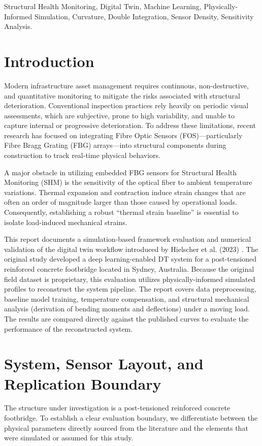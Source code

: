 \documentclass[11pt,journal,onecolumn]{IEEEtran}
\begin{document}
\begin{IEEEkeywords}
Structural Health Monitoring, Digital Twin, Machine Learning, Physically-Informed Simulation, Curvature, Double Integration, Sensor Density, Sensitivity Analysis.
\end{IEEEkeywords}

\newpage

\section{Introduction}
Modern infrastructure asset management requires continuous, non-destructive, and quantitative monitoring to mitigate the risks associated with structural deterioration. Conventional inspection practices rely heavily on periodic visual assessments, which are subjective, prone to high variability, and unable to capture internal or progressive deterioration. To address these limitations, recent research has focused on integrating Fibre Optic Sensors (FOS)---particularly Fibre Bragg Grating (FBG) arrays---into structural components during construction to track real-time physical behaviors.

A major obstacle in utilizing embedded FBG sensors for Structural Health Monitoring (SHM) is the sensitivity of the optical fiber to ambient temperature variations. Thermal expansion and contraction induce strain changes that are often an order of magnitude larger than those caused by operational loads. Consequently, establishing a robust ``thermal strain baseline'' is essential to isolate load-induced mechanical strains.

This report documents a simulation-based framework evaluation and numerical validation of the digital twin workflow introduced by Hielscher et al. (2023) \cite{hielscher2023neural}. The original study developed a deep learning-enabled DT system for a post-tensioned reinforced concrete footbridge located in Sydney, Australia. Because the original field dataset is proprietary, this evaluation utilizes physically-informed simulated profiles to reconstruct the system pipeline. The report covers data preprocessing, baseline model training, temperature compensation, and structural mechanical analysis (derivation of bending moments and deflections) under a moving load. The results are compared directly against the published curves to evaluate the performance of the reconstructed system.

\section{System, Sensor Layout, and Replication Boundary}
The structure under investigation is a post-tensioned reinforced concrete footbridge. To establish a clear evaluation boundary, we differentiate between the physical parameters directly sourced from the literature and the elements that were simulated or assumed for this study.
\end{document}

